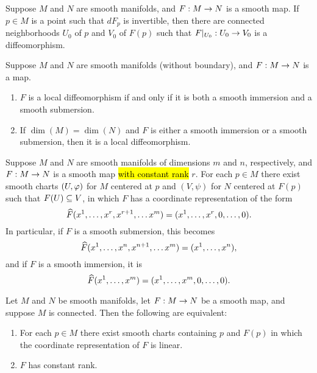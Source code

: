 \setcounter{thm}{4}

\begin{thm}
Suppose $M$ and $N$ are smooth manifolds, and $F:M\rightarrow N$ is a smooth map. If $p\in M$ is a point such that $dF_p$ is invertible, then there are connected neighborhoods $U_0$ of $p$ and $V_0$ of $F(p)$ such that $F|_{U_0}:U_0\rightarrow V_0$ is a diffeomorphism.
\end{thm}

\setcounter{thm}{7}

\begin{prop}
Suppose $M$ and $N$ are smooth manifolds (without boundary), and $F:M\rightarrow N$ is a map.
\begin{enumerate}
    \item $F$ is a local diffeomorphism if and only if it is both a smooth immersion and a smooth submersion.
    \item If $\dim(M) = \dim(N)$ and $F$ is either a smooth immersion or a smooth submersion, then it is a local diffeomorphism.
\end{enumerate}
\end{prop}

\setcounter{thm}{11}

\begin{thm}
Suppose $M$ and $N$ are smooth manifolds of dimensions $m$ and $n$, respectively, and $F:M\rightarrow N$ is a smooth map \hl{with constant rank} $r$. For each $p\in M$ there exist smooth charts $(U,\varphi)$ for $M$ centered at $p$ and $(V,\psi)$ for $N$ centered at $F(p)$ such that $F(U)\subseteq V$, in which $F$ has a coordinate representation of the form
\[\widehat F(x^1,\ldots,x^r,x^{r+1},\dots x^m) = (x^1,\ldots,x^r,0,\ldots,0).\]
In particular, if $F$ is a smooth submersion, this becomes
\[\widehat F(x^1,\ldots,x^n,x^{n+1},\dots x^m) = (x^1,\ldots,x^n),\]
and if $F$ is a smooth immersion, it is
\[\widehat F(x^1,\ldots, x^m) = (x^1,\ldots,x^m,0,\ldots,0).\]
\end{thm}

\begin{cor}
Let $M$ and $N$ be smooth manifolds, let $F:M\rightarrow N$ be a smooth map, and suppose $M$ is connected. Then the following are equivalent:
\begin{enumerate}
    \item For each $p\in M$ there exist smooth charts containing $p$ and $F(p)$ in which the coordinate representation of $F$ is linear.
    \item $F$ has constant rank.
\end{enumerate}
\end{cor}


